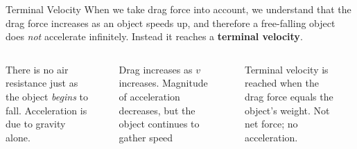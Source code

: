 \documentclass[12pt,compress,aspectratio=169]{beamer}
\newcommand{\mb}[1]{\ensuremath\mathbf{#1}}
\begin{document}
\begin{frame}{Terminal Velocity}
  When we take drag force into account, we understand that the drag force
  increases as an object speeds up, and therefore a free-falling object does
  \emph{not} accelerate infinitely. Instead it reaches a
  \textbf{terminal velocity}.

  \begin{columns}
    
    {\footnotesize There is no air resistance just as the object \emph{begins}
      to fall. Acceleration is due to gravity alone.\par}

    \vspace{-.15in}
    \begin{center}
    \end{center}
    

    {\footnotesize Drag increases as $v$ increases. Magnitude of acceleration
      decreases, but the object continues to gather speed\par}

    \vspace{-.15in}
    \begin{center}
    \end{center}
    
    
    {\footnotesize Terminal velocity is reached when the drag force equals the
      object's weight. Not net force; no acceleration.\par}

    \vspace{-.15in}
    \begin{center}
    \end{center}
        
  \end{columns}
\end{frame}
\end{document}
